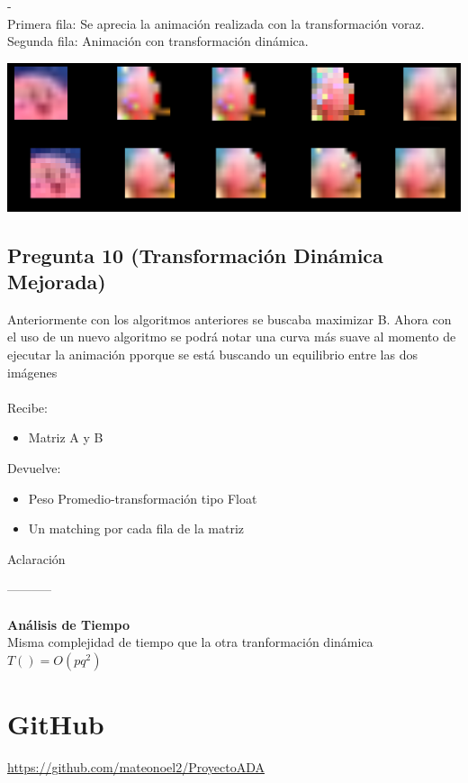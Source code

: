 \documentclass{article}
\newcommand{\TITLE}[1]{\item[#1]}
\begin{document}
-\\Primera fila: Se aprecia la animación realizada con la transformación voraz.\\ Segunda fila: Animación con transformación dinámica.
		\begin{center}
			\includegraphics[scale=0.35]{b.png}
		\end{center}
		
		\subsection*{Pregunta 10 (Transformación Dinámica Mejorada)}
		Anteriormente con los algoritmos anteriores se buscaba maximizar B. Ahora con el uso de un nuevo algoritmo se podrá notar una curva más suave al momento de ejecutar la animación pporque se está buscando un equilibrio entre las dos imágenes\\\\
		Recibe:
		\begin{itemize}
			\item Matriz A y B
		\end{itemize}
		Devuelve: 
		\begin{itemize}
			\item Peso Promedio-transformación tipo Float
			\item Un matching por cada fila de la matriz
		\end{itemize}
		Aclaración
		\\
		\begin{algorithmic}
			\TITLE{\textsc{Transformación-Dinámica-Promedio}$(A, B)$}
		\end{algorithmic}
		-----------\\\\
		\textbf{Análisis de Tiempo}\\
		Misma complejidad de tiempo que la otra tranformación dinámica $T()=O(pq^2)$
		
\section{GitHub}
\href{https://github.com/mateonoel2/ProyectoADA}{https://github.com/mateonoel2/ProyectoADA}
\end{document}
